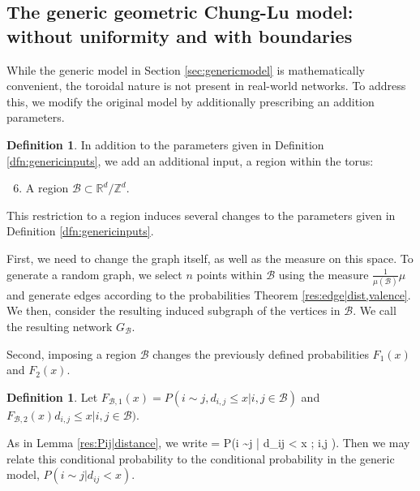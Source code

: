 \documentclass[11]{article}
\newcommand{\sanote}{\todo[color=violet!30]}
\def\bas #1\eas{\begin{align*} #1 \end{align*}}
\newcommand{\rB}{\mathcal{B}}
\theoremstyle{remark}
\theoremstyle{definition}
\newtheorem{dfn}[thm]{Definition}
\begin{document}
\subsection{The generic geometric Chung-Lu model: without uniformity and with boundaries \label{sec:specific}}

While the generic model in Section \ref{sec:genericmodel} is mathematically convenient, the toroidal nature is not present in real-world networks. To address this, we modify the original model by additionally prescribing an addition parameters.

\begin{dfn} \label{dfn:specificinputs}
In addition to the parameters given in Definition \ref{dfn:genericinputs}, we add an additional input, a region within the torus:
\begin{enumerate} \setcounter{enumi}{5} 
    \item A region $\rB \subset \mathbb{R}^d / \mathbb{Z}^d$.
\end{enumerate}
\end{dfn}

This restriction to a region induces several changes to the parameters given in Definition \ref{dfn:genericinputs}.

First, we need to change the graph itself, as well as the measure on this space. To generate a random graph, we select $n$ points within $\rB$ using the measure $\frac{1}{\mu(\rB)} \mu$ and generate edges according to the probabilities Theorem \ref{res:edge|dist,valence}.  We then, consider the resulting induced subgraph of the vertices in $\rB$. We call the resulting network $G_{\rB}$.

Second, imposing a region $\rB$ changes the previously defined probabilities $F_1(x)$ and $F_2(x)$. 

\begin{dfn}
Let $F_{\rB,1}(x) = P(i \sim j, d_{i,j}\leq x | i,j \in \rB)$ and $F_{\rB,2}(x) d_{i,j}\leq x | i,j \in \rB)$.
\end{dfn}




As in Lemma \ref{res:Pij|distance}, we write \bas \frac{F_{\rB,1}(x)}{F_{\rB,2}(x)} = P(i \sim j | d_{ij} < x \; ;  i,j \in \rB)\;. \eas Then we may relate this conditional probability to the conditional probability in the generic model, $P(i \sim j | d_{ij} < x)$.
\end{document}
